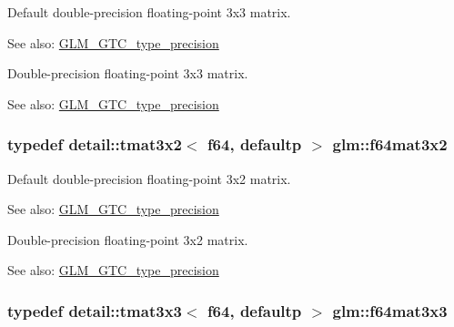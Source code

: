 Default double-precision floating-point 3x3 matrix. \begin{Desc}
\item[See also:]\hyperlink{group__gtc__type__precision}{GLM\_\-GTC\_\-type\_\-precision}\end{Desc}
Double-precision floating-point 3x3 matrix. \begin{Desc}
\item[See also:]\hyperlink{group__gtc__type__precision}{GLM\_\-GTC\_\-type\_\-precision} \end{Desc}
\hypertarget{group__gtc__type__precision_ge6388c7664b5bb281047a9fd7984f97b}{
\subsubsection[f64mat3x2]{\setlength{\rightskip}{0pt plus 5cm}typedef detail::tmat3x2$<$ f64, defaultp $>$ {\bf glm::f64mat3x2}}}
\label{group__gtc__type__precision_ge6388c7664b5bb281047a9fd7984f97b}


Default double-precision floating-point 3x2 matrix. \begin{Desc}
\item[See also:]\hyperlink{group__gtc__type__precision}{GLM\_\-GTC\_\-type\_\-precision}\end{Desc}
Double-precision floating-point 3x2 matrix. \begin{Desc}
\item[See also:]\hyperlink{group__gtc__type__precision}{GLM\_\-GTC\_\-type\_\-precision} \end{Desc}
\hypertarget{group__gtc__type__precision_gd74db0197015b8d1d77ce54cf8d0ae60}{
\subsubsection[f64mat3x3]{\setlength{\rightskip}{0pt plus 5cm}typedef detail::tmat3x3$<$ f64, defaultp $>$ {\bf glm::f64mat3x3}}}
\label{group__gtc__type__precision_gd74db0197015b8d1d77ce54cf8d0ae60}


